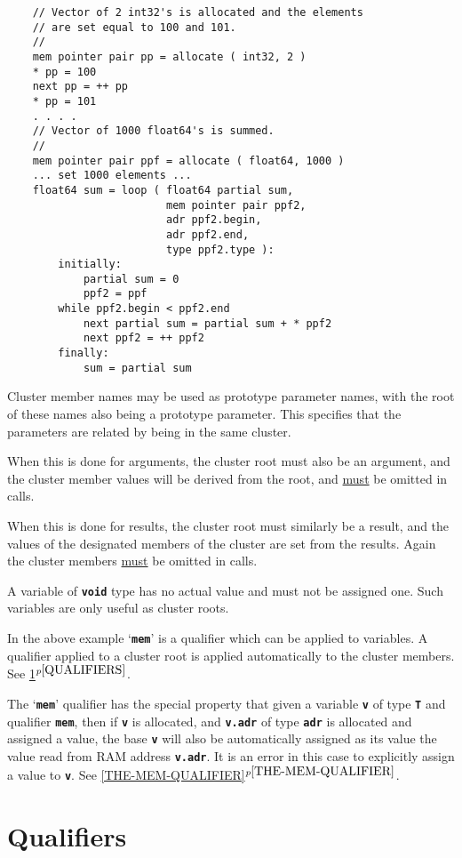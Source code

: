 \documentclass[12pt]{article}
\newcommand{\TT}[1]{{\tt \bfseries #1}}
\newcommand{\itemref}[1]{\ref{#1}$^{p\pageref{#1}}$}
\newenvironment{indpar}[1][0.3in]%
	{\begin{list}{}%
		     {\setlength{\itemsep}{0in}%
		      \setlength{\topsep}{0in}%
		      \setlength{\parsep}{1ex}%
		      \setlength{\labelwidth}{#1}%
		      \setlength{\leftmargin}{#1}%
		      \addtolength{\leftmargin}{\labelsep}}%
	 \item}%
	{\end{list}}
\begin{document}
\begin{indpar}
\begin{verbatim}
    // Vector of 2 int32's is allocated and the elements
    // are set equal to 100 and 101.
    //
    mem pointer pair pp = allocate ( int32, 2 )
    * pp = 100
    next pp = ++ pp
    * pp = 101
    . . . .
    // Vector of 1000 float64's is summed.
    //
    mem pointer pair ppf = allocate ( float64, 1000 )
    ... set 1000 elements ...
    float64 sum = loop ( float64 partial sum,
                         mem pointer pair ppf2,
                         adr ppf2.begin,
                         adr ppf2.end,
                         type ppf2.type ):
        initially:
            partial sum = 0
            ppf2 = ppf
        while ppf2.begin < ppf2.end
            next partial sum = partial sum + * ppf2
            next ppf2 = ++ ppf2
        finally:
            sum = partial sum
\end{verbatim}\end{indpar}

Cluster member names may be used as prototype parameter
names, with the root of these names also being a prototype
parameter.  This specifies that the parameters are related
by being in the same cluster.

When this is done for arguments, the cluster root must
also be an argument, and the cluster member values
will be derived from the root, and \underline{must}
be omitted in calls.

When this is done for results, the cluster root must similarly
be a result, and the values of the designated
members of the cluster are set from the results.
Again the cluster members \underline{must} be omitted in calls.

A variable of \TT{void} type has no actual value
and must not be assigned one.  Such variables are only useful
as cluster roots.

In the above example `\TT{mem}' is a qualifier
which can be applied to variables.
A qualifier applied to a cluster root is applied automatically
to the cluster members.  See \itemref{QUALIFIERS}.

The `\TT{mem}' qualifier has the special property that given a variable
\TT{v} of type \TT{T} and qualifier \TT{mem}, then if \TT{v} is allocated,
and \TT{v.adr} of type \TT{adr} is allocated and
assigned a value, the base \TT{v} will also be automatically
assigned as its value the value read from RAM address \TT{v.adr}.
It is an error in this case to explicitly assign a value to \TT{v}.
See \itemref{THE-MEM-QUALIFIER}.

\section{Qualifiers}
\label{QUALIFIERS}
\end{document}
